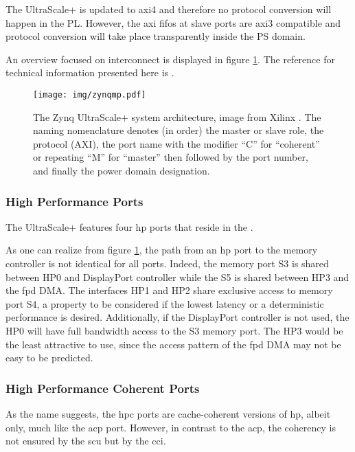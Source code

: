 The UltraScale+ is updated to \gls{axi}4 and therefore no protocol
conversion will happen in the PL. However, the \gls{axi} \glspl{fifo} at slave ports
are \gls{axi}3 compatible and protocol conversion will take place transparently
inside the PS domain.

An overview focused on interconnect
is displayed in figure \ref{fig:zynqmp-interconnect}. 
The reference for technical information presented here is \cite{ug1085}.

\begin{figure}[htbp]
  \centering
  \texttt{[image: img/zynqmp.pdf]}
  \caption{The Zynq UltraScale+ system architecture, image from Xilinx \cite{ug1085}.
  The naming nomenclature denotes (in order) the master or slave role, 
  the protocol (AXI), the port name with the modifier ``C'' for ``coherent'' or
  repeating ``M'' for ``master'' then followed by the port number, and finally
  the power domain designation.
  }
  \label{fig:zynqmp-interconnect}
\end{figure}


\subsubsection{High Performance Ports}
\label{sect:implementation}

The UltraScale+ features four \gls{hp} ports that reside in the .

As one can realize from figure \ref{fig:zynqmp-interconnect},
the path from an \gls{hp} port to the memory controller is not identical for all ports.
Indeed, the memory port S3 is shared between HP0 and DisplayPort controller
while the S5 is shared between HP3 and the \gls{fpd} DMA.
The interfaces HP1 and HP2 share exclusive access to memory port S4,
a property to be considered if the lowest latency 
or a deterministic performance is desired. Additionally, if the DisplayPort
controller is not used, the HP0 will have full bandwidth access to the S3 memory port.
The HP3 would be the least attractive to use, 
since the access pattern of the \gls{fpd} DMA may not be easy to be predicted.

\subsubsection{High Performance Coherent Ports}

As the name suggests, the \gls{hpc} ports are cache-coherent versions of \gls{hp}, 
albeit  only, much like the \gls{acp} port. 
However, in contrast to the \gls{acp},
the coherency is not ensured by the \gls{scu} but by the \gls{cci}.

